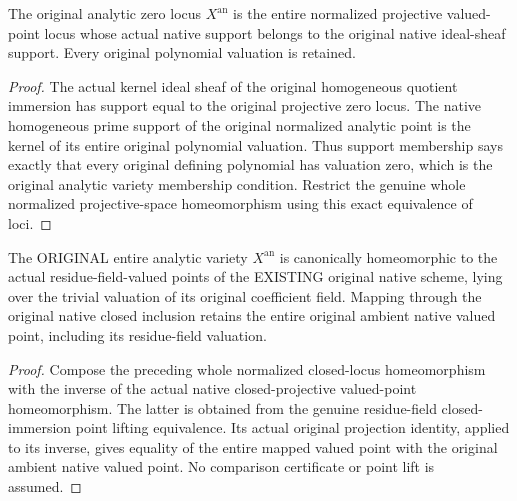 \begin{lemma}
\label{lem:fc-original-analytic-native-support-locus}
\leanok
{}
The original analytic zero locus $X^{\mathrm{an}}$ is the entire normalized
projective valued-point locus whose actual native support belongs to the
original native ideal-sheaf support.  Every original polynomial valuation is retained.
\end{lemma}
\begin{proof}
The actual kernel ideal sheaf of the original homogeneous quotient immersion
has support equal to the original projective zero locus.  The native homogeneous
prime support of the original normalized analytic point is the kernel of its
entire original polynomial valuation.  Thus support membership says exactly
that every original defining polynomial has valuation zero, which is the original
analytic variety membership condition.  Restrict the genuine whole normalized
projective-space homeomorphism using this exact equivalence of loci.
\end{proof}

\begin{theorem}
\label{thm:fc-original-analytic-native-homeomorphism}
\leanok
{}
The ORIGINAL entire analytic variety $X^{\mathrm{an}}$ is canonically homeomorphic
to the actual residue-field-valued points of the EXISTING original native scheme,
lying over the trivial valuation of its original coefficient field.  Mapping
through the original native closed inclusion retains the entire original
ambient native valued point, including its residue-field valuation.
\end{theorem}
\begin{proof}
Compose the preceding whole normalized closed-locus homeomorphism with the
inverse of the actual native closed-projective valued-point homeomorphism.
The latter is obtained from the genuine residue-field closed-immersion point
lifting equivalence.  Its actual original projection identity, applied to its
inverse, gives equality of the entire mapped valued point with the original
ambient native valued point.  No comparison certificate or point lift is assumed.
\end{proof}

